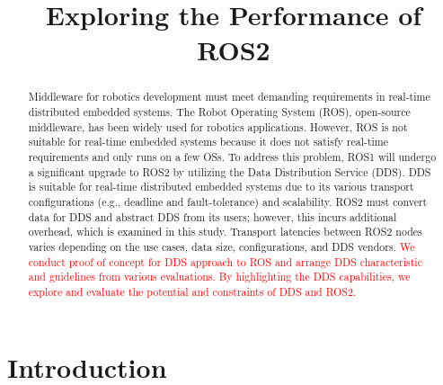 \documentclass{sig-alternate-05-2015}
\title{Exploring the Performance of ROS2}
\begin{document}
\maketitle

\setcounter{topnumber}{5}%
\def\topfraction{1.00}%
\setcounter{bottomnumber}{5}%
\def\bottomfraction{1.00}%
\setcounter{totalnumber}{10}%
\def\textfraction{0.00}%


\begin{abstract}
  Middleware for robotics development must meet demanding requirements in real-time distributed embedded systems. 
  The Robot Operating System (ROS), open-source middleware, has been widely used for robotics applications.
  However, ROS is not suitable for real-time embedded systems because it does not satisfy real-time requirements and only runs on a few OSs.
  To address this problem, ROS1 will undergo a significant upgrade to ROS2 by utilizing the Data Distribution Service (DDS).
  DDS is suitable for real-time distributed embedded systems due to its various transport configurations (e.g., deadline and fault-tolerance) and scalability.
  ROS2 must convert data for DDS and abstract DDS from its users; however, this incurs additional overhead, which is examined in this study.
  Transport latencies between ROS2 nodes varies depending on the use cases, data size, configurations, and DDS vendors.
  \textcolor{red}{We conduct proof of concept for DDS approach to ROS and arrange DDS characteristic and guidelines from various evaluations.
  By highlighting the DDS capabilities, we explore and evaluate the potential and constraints of DDS and ROS2.}
\end{abstract}

\vspace{-2mm}

\vspace{-3mm}
\section{Introduction}
\label{sec:orgheadline5}
\end{document}

